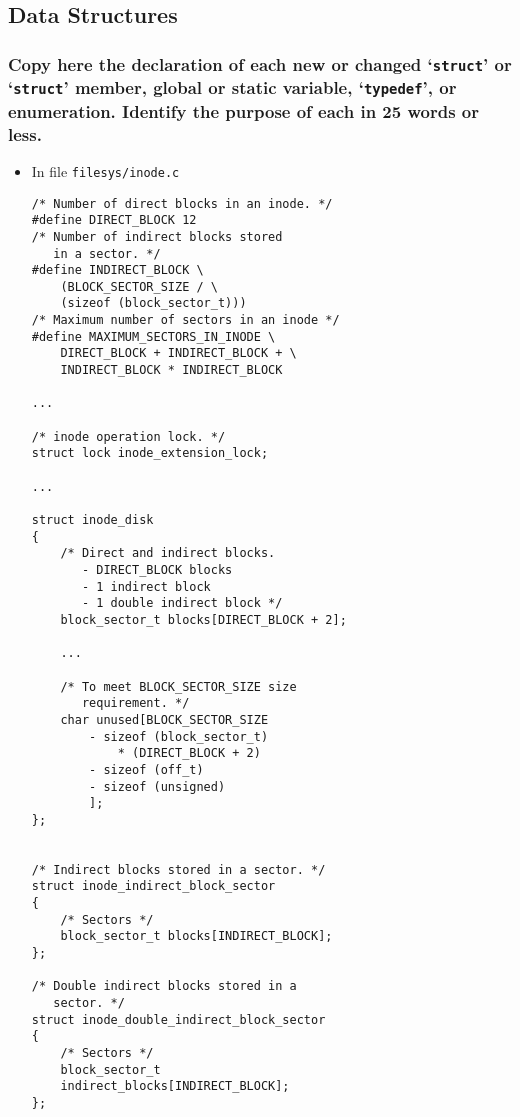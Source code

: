 \documentclass[sigconf, nonacm, balance=false, urlbreakonhyphens=true]{acmart}
\begin{document}
        \label{Indexed and Extensible Files}
    
        \subsection{Data Structures}
        
            \subsubsection{Copy here the declaration of each new or changed `\texttt{struct}' or `\texttt{struct}' member, global or static variable, `\texttt{typedef}', or enumeration. Identify the purpose of each in 25 words or less. }
        
                \begin{itemize}
                    \item In file \texttt{filesys/inode.c}
\begin{verbatim}
/* Number of direct blocks in an inode. */
#define DIRECT_BLOCK 12
/* Number of indirect blocks stored 
   in a sector. */
#define INDIRECT_BLOCK \
    (BLOCK_SECTOR_SIZE / \
    (sizeof (block_sector_t)))
/* Maximum number of sectors in an inode */
#define MAXIMUM_SECTORS_IN_INODE \
    DIRECT_BLOCK + INDIRECT_BLOCK + \
    INDIRECT_BLOCK * INDIRECT_BLOCK

...

/* inode operation lock. */
struct lock inode_extension_lock;

...

struct inode_disk
{
    /* Direct and indirect blocks. 
       - DIRECT_BLOCK blocks
       - 1 indirect block
       - 1 double indirect block */
    block_sector_t blocks[DIRECT_BLOCK + 2];
    
    ...

    /* To meet BLOCK_SECTOR_SIZE size 
       requirement. */
    char unused[BLOCK_SECTOR_SIZE
        - sizeof (block_sector_t) 
            * (DIRECT_BLOCK + 2)
        - sizeof (off_t)
        - sizeof (unsigned)
        ];
};


/* Indirect blocks stored in a sector. */
struct inode_indirect_block_sector
{
    /* Sectors */
    block_sector_t blocks[INDIRECT_BLOCK];
};

/* Double indirect blocks stored in a 
   sector. */
struct inode_double_indirect_block_sector
{
    /* Sectors */
    block_sector_t 
    indirect_blocks[INDIRECT_BLOCK];
}; 
\end{verbatim}
                \end{itemize}
            
\end{document}
